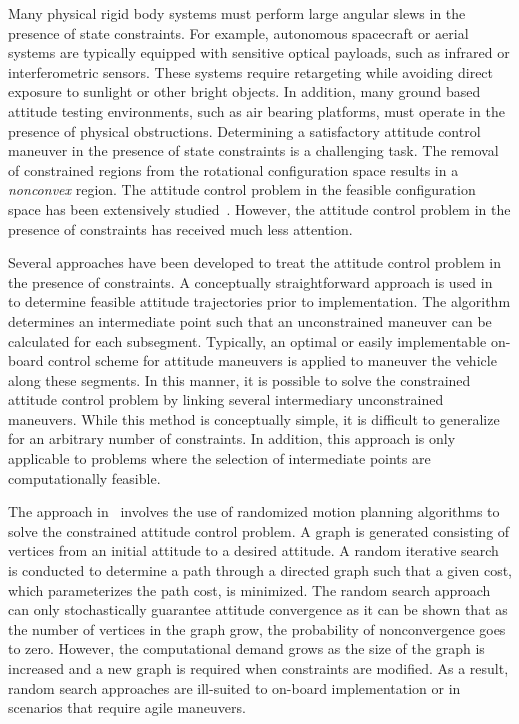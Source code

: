 \documentclass[fleqn]{IJCAS}  %
\begin{document}
\begin{multicols}{2}
Many physical rigid body systems must perform large angular slews in the presence of state constraints.
For example, autonomous spacecraft or aerial systems are typically equipped with sensitive optical payloads, such as infrared or interferometric sensors.
These systems require retargeting while avoiding direct exposure to sunlight or other bright objects.
In addition, many ground based attitude testing environments, such as air bearing platforms, must operate in the presence of physical obstructions.
Determining a satisfactory attitude control maneuver in the presence of state constraints is a challenging task.
The removal of constrained regions from the rotational configuration space results in a \textit{nonconvex} region.
The attitude control problem in the feasible configuration space has been extensively studied~\cite{bullo2004,MayTeePaCC11,LEEITAC15}.
However, the attitude control problem in the presence of constraints has received much less attention.

Several approaches have been developed to treat the attitude control problem in the presence of constraints.
A conceptually straightforward approach is used in~\cite{hablani1999} to determine feasible attitude trajectories prior to implementation.
The algorithm determines an intermediate point such that an unconstrained maneuver can be calculated for each subsegment.
Typically, an optimal or easily implementable on-board control scheme for attitude maneuvers is applied to maneuver the vehicle along these segments.
In this manner, it is possible to solve the constrained attitude control problem by linking several intermediary unconstrained maneuvers.
While this method is conceptually simple, it is difficult to generalize for an arbitrary number of constraints.
In addition, this approach is only applicable to problems where the selection of intermediate points are computationally feasible.

The approach in~\cite{frazzoli2001} involves the use of randomized motion planning algorithms to solve the constrained attitude control problem.
A graph is generated consisting of vertices from an initial attitude to a desired attitude. 
A random iterative search is conducted to determine a path through a directed graph such that a given cost, which parameterizes the path cost, is minimized.
The random search approach can only stochastically guarantee attitude convergence as it can be shown that as the number of vertices in the graph grow, the probability of nonconvergence goes to zero.
However, the computational demand grows as the size of the graph is increased and a new graph is required when constraints are modified. 
As a result, random search approaches are ill-suited to on-board implementation or in scenarios that require agile maneuvers.


\end{multicols}
\end{document}
